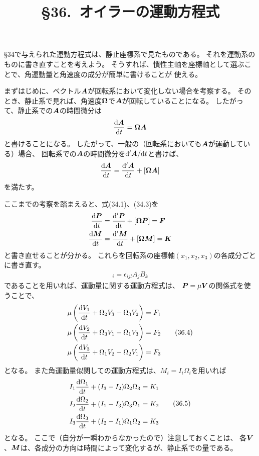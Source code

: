 \documentclass[a4paper]{jsarticle}
\title{\S 36.\ オイラーの運動方程式}
\def\vec#1{\mbox{\boldmath $#1$}}
\newcommand{\dif}[2]{\frac{{\rm d} #1}{{\rm d} #2}}
\newcommand{\ddif}{{\rm d}}
\begin{document}
\maketitle

\S 34で与えられた運動方程式は、静止座標系で見たものである。
それを運動系のものに書き直すことを考えよう。
そうすれば、慣性主軸を座標軸として選ぶことで、角運動量と角速度の成分が簡単に書けることが
使える。

まずはじめに、ベクトル$\vec{A}$が回転系において変化しない場合を考察する。
そのとき、静止系で見れば、角速度$\vec{\Omega}$で$\vec{A}$が回転していることになる。
したがって、静止系での$\vec{A}$の時間微分は
\begin{align}
	\dif{\vec{A}}{t} = {\vec{\Omega} \vec{A}}
\end{align}
と書けることになる。
したがって、一般の（回転系においても$\vec{A}$が運動している）場合、
回転系での$\vec{A}$の時間微分を$\ddif^{\prime} \vec{A} / \ddif t$と書けば、
\begin{align}
	\dif{\vec{A}}{t} = \dif{^{\prime}\vec{A}}{t} + [\vec{\Omega} \vec{A}]
\end{align}
を満たす。

ここまでの考察を踏まえると、式(34.1)、(34.3)を
\begin{align}
	\dif{\vec{P}}{t} &= \dif{^{\prime}\vec{P}}{t} + [\vec{\Omega} \vec{P}]
	= \vec{F} \\
	\dif{\vec{M}}{t} &= \dif{^{\prime}\vec{M}}{t} + [\vec{\Omega} \vec{M}]
	= \vec{K}
\end{align}
と書き直せることが分かる。
これらを回転系の座標軸$(x_1, x_2, x_3)$の各成分ごとに書き直す。
\begin{align}
	[\vec{A} \vec{B}]_i = \epsilon_{ijl} A_j B_k
\end{align}
であることを用いれば、運動量に関する運動方程式は、
$\vec{P} = \mu \vec{V}$の関係式を使うことで、
\begin{align}
\begin{split}
	\mu \left( \dif{V_1}{t} + \Omega_2 V_3 - \Omega_3 V_2 \right) &= F_1 \\
	\mu \left( \dif{V_2}{t} + \Omega_3 V_1 - \Omega_1 V_3 \right) &= F_2 \\
	\mu \left( \dif{V_3}{t} + \Omega_1 V_2 - \Omega_2 V_1 \right) &= F_3
\end{split} \tag{36.4}
\end{align}
となる。
また角運動量似関しての運動方程式は、$M_i = I_i \Omega_i$を用いれば
\begin{align}
\begin{split}
	I_1 \dif{\Omega_1}{t} + (I_3 - I_2) \Omega_2 \Omega_3 &= K_1 \\
	I_2 \dif{\Omega_2}{t} + (I_1 - I_3) \Omega_3 \Omega_1 &= K_2 \\
	I_3 \dif{\Omega_3}{t} + (I_2 - I_1) \Omega_1 \Omega_2 &= K_3
\end{split} \tag{36.5}
\end{align}
となる。
ここで（自分が一瞬わからなかったので）注意しておくことは、
各$\vec{V}$、$\vec{M}$は、各成分の方向は時間によって変化するが、静止系での量である。
\end{document}
